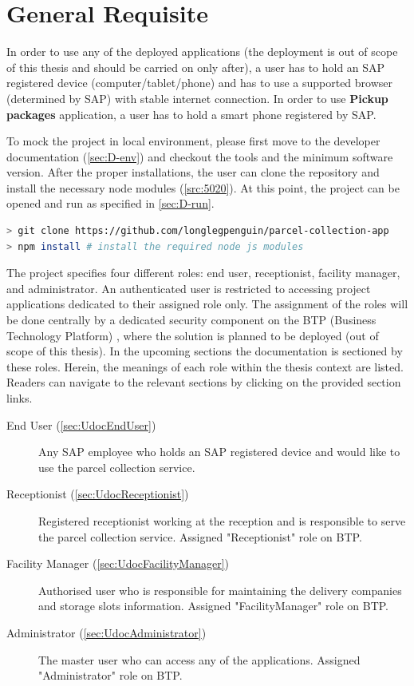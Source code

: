 \section{General Requisite}
\label{sec:GeneralRequisite}
In order to use any of the deployed applications (the deployment is out of scope of this thesis and should be carried on only after), a user has to hold an SAP registered device (computer/tablet/phone) and has to use a supported browser (determined by SAP) with stable internet connection. In order to use \textbf{Pickup packages} application, a user has to hold a smart phone registered by SAP. 

To mock the project in local environment, please first move to the developer documentation (\autoref{sec:D-env}) and checkout the tools and the minimum software version. After the proper installations, the user can clone the repository and install the necessary node modules (\autoref{src:5020}). At this point, the project can be opened and run as specified in \autoref{sec:D-run}.

\begin{lstlisting}[language={bash}]
> git clone https://github.com/longlegpenguin/parcel-collection-app 
> npm install # install the required node js modules 
\end{lstlisting}

The project specifies four different roles: end user, receptionist, facility manager, and administrator. An authenticated user is restricted to accessing project applications dedicated to their assigned role only. The assignment of the roles will be done centrally by a dedicated security component on the BTP (Business Technology Platform) \cite{btp}, where the solution is planned to be deployed (out of scope of this thesis). In the upcoming sections the documentation is sectioned by these roles. Herein, the meanings of each role within the thesis context are listed. Readers can navigate to the relevant sections by clicking on the provided section links.

\begin{description}
	\item[End User (\autoref{sec:UdocEndUser})] Any SAP employee who holds an SAP registered device and would like to use the parcel collection service.
	\item[Receptionist (\autoref{sec:UdocReceptionist})] Registered receptionist working at the reception and is responsible to serve the parcel collection service. Assigned "Receptionist" role on BTP.
	\item[Facility Manager (\autoref{sec:UdocFacilityManager})] Authorised user who is responsible for maintaining the delivery companies and storage slots information. Assigned "FacilityManager" role on BTP.
	\item[Administrator (\autoref{sec:UdocAdministrator})] The master user who can access any of the applications. Assigned "Administrator" role on BTP.
\end{description}

